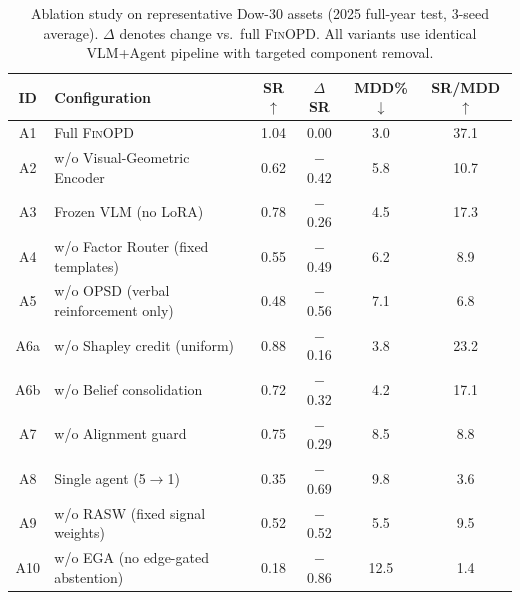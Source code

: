 \begin{table}[t]
\renewcommand{\arraystretch}{0.95}
\footnotesize
\caption{Ablation study on representative Dow-30 assets (2025 full-year test, 3-seed average). $\Delta$ denotes change vs.\ full \textsc{FinOPD}. All variants use identical VLM+Agent pipeline with targeted component removal.}
\setlength{\abovecaptionskip}{0.1cm}
\centering
\setlength{\tabcolsep}{3pt}
\begin{tabular}{clcccc}
\toprule
ID & Configuration & SR$\uparrow$ & $\Delta$SR & MDD\%$\downarrow$ & SR/MDD$\uparrow$ \\
\midrule
A1 & Full \textsc{FinOPD} & 1.04 & 0.00 & 3.0 & 37.1 \\
\midrule
A2 & w/o Visual-Geometric Encoder & 0.62 & $-$0.42 & 5.8 & 10.7 \\
A3 & Frozen VLM (no LoRA) & 0.78 & $-$0.26 & 4.5 & 17.3 \\
A4 & w/o Factor Router (fixed templates) & 0.55 & $-$0.49 & 6.2 & 8.9 \\
A5 & w/o OPSD (verbal reinforcement only) & 0.48 & $-$0.56 & 7.1 & 6.8 \\
A6a & w/o Shapley credit (uniform) & 0.88 & $-$0.16 & 3.8 & 23.2 \\
A6b & w/o Belief consolidation & 0.72 & $-$0.32 & 4.2 & 17.1 \\
A7 & w/o Alignment guard & 0.75 & $-$0.29 & 8.5 & 8.8 \\
A8 & Single agent (5$\to$1) & 0.35 & $-$0.69 & 9.8 & 3.6 \\
A9 & w/o RASW (fixed signal weights) & 0.52 & $-$0.52 & 5.5 & 9.5 \\
A10 & w/o EGA (no edge-gated abstention) & 0.18 & $-$0.86 & 12.5 & 1.4 \\
\bottomrule
\end{tabular}
\label{tab:ablation}
\end{table}
